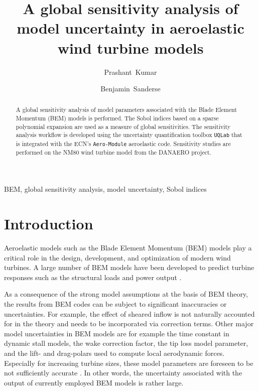 \documentclass[review]{elsarticle}
\numberwithin{equation}{section}
\numberwithin{equation}{section}
\begin{document}
\begin{frontmatter}
\title{A global sensitivity analysis of model uncertainty in aeroelastic wind turbine models}

\address[cwi]{Centrum Wiskunde \& Informatica (CWI), Amsterdam, The Netherlands}
\author[]{Prashant~Kumar}

\author{Benjamin~Sanderse}

\begin{abstract}
A global sensitivity analysis of model parameters associated with the Blade Element Momentum (BEM) models is performed. The Sobol indices based on a sparse polynomial  expansion are used as a measure of global sensitivities. The sensitivity analysis workflow is developed using the uncertainty quantification toolbox \texttt{UQLab} that is integrated with the ECN's \texttt{Aero-Module} aeroelastic code. Sensitivity studies are performed on the NM80 wind turbine model from the DANAERO project.
\end{abstract}
\begin{keyword}
BEM, global sensitivity analysis, model uncertainty, Sobol indices
\end{keyword}
\end{frontmatter}

\linenumbers

\section{Introduction}
Aeroelastic models such as the Blade Element Momentum (BEM) models \cite{HandBook} play a critical role in the design, development, and optimization of modern wind turbines. A large number of BEM models have been developed to predict turbine responses such as the structural loads and power output \cite{Vorpahl2013}. 

As a consequence of the strong model assumptions at the basis of BEM theory, the results from BEM codes can be subject to significant inaccuracies or uncertainties. For example, the effect of sheared inflow \cite{Madsen2012} is not naturally accounted for in the theory and needs to be incorporated via correction terms. Other major model uncertainties in BEM models are for example the time constant in dynamic stall models, the wake correction factor, the tip loss model parameter, and the lift- and drag-polars used to compute local aerodynamic forces. Especially for increasing turbine sizes, these model parameters are foreseen to be not sufficiently accurate \cite{Sayed2019}. In other words, the uncertainty associated with the output of currently employed BEM models is rather large. 
\end{document}
